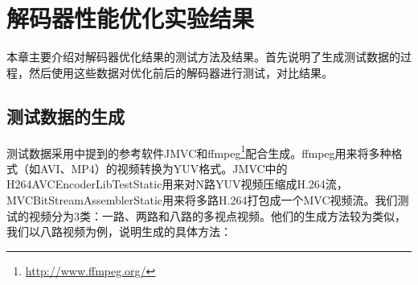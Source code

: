 

\cleardoublepage

\chapter{解码器性能优化实验结果}
\label{cha:optresultandanalysis}

本章主要介绍对解码器优化结果的测试方法及结果。首先说明了生成测试数据的过程，然后使用这些数据对优化前后的解码器进行测试，对比结果。

\section{测试数据的生成}
\label{sec:optresultsgeneration}

测试数据采用中提到的参考软件JMVC和ffmpeg\footnote{\url{http://www.ffmpeg.org/}}配合生成。ffmpeg用来将多种格式（如AVI、MP4）的视频转换为YUV格式。JMVC中的H264AVCEncoderLibTestStatic用来对N路YUV视频压缩成H.264流，MVCBitStreamAssemblerStatic用来将多路H.264打包成一个MVC视频流。我们测试的视频分为3类：一路、两路和八路的多视点视频。他们的生成方法较为类似，我们以八路视频为例，说明生成的具体方法：
